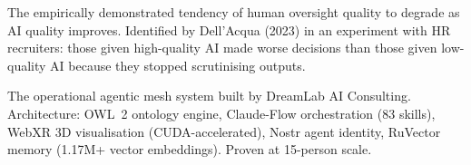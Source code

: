 \begin{description}[style=nextline, leftmargin=2em, font=\bfseries\color{navyblue}]
\item[Vigilance Problem]
The empirically demonstrated tendency of human oversight quality to degrade as AI quality improves. Identified by Dell'Acqua (2023) in an experiment with HR recruiters: those given high-quality AI made worse decisions than those given low-quality AI because they stopped scrutinising outputs.

\item[VisionClaw]
The operational agentic mesh system built by DreamLab AI Consulting. Architecture: OWL~2 ontology engine, Claude-Flow orchestration (83 skills), WebXR 3D visualisation (CUDA-accelerated), Nostr agent identity, RuVector memory (1.17M+ vector embeddings). Proven at 15-person scale.

\end{description}
